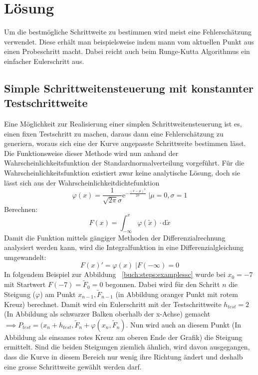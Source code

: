 %
%
%
\section{Lösung
  \label{steps:section:loesung}}
Um die bestmögliche Schrittweite zu bestimmen wird meist eine Fehlerschätzung verwendet.
Diese erhält man beispielsweise indem mann vom aktuellen Punkt aus einen Probeschritt macht.
Dabei reicht auch beim Runge-Kutta Algorithmus ein einfacher Eulerschritt aus.

\subsection{Simple Schrittweitensteuerung mit konstannter Testschrittweite
  \label{steps:subsection:simplestep}}
Eine Möglichkeit zur Realisierung einer simplen Schrittweitensteuerung ist es, einen fixen Testschritt zu machen,
daraus dann eine Fehlerschätzung zu generiern, woraus sich eine der Kurve angepasste Schrittweite bestimmen lässt.
Die Funktionsweise dieser Methode wird nun anhand der Wahrscheinlichkeitsfunktion der Standardnormalverteilung vorgeführt.
Für die Wahrscheinlichkeitsfunktion existiert zwar keine analytische Lösung,
doch sie lässt sich aus der Wahrscheinlichkeitdichtefunktion
\[
  \varphi(x)=\frac{1}{\sqrt{2\pi}\sigma}\mathrm{e}^{-\frac{(x-\mu)^2}{2 \sigma}}\;|\mu=0,\sigma=1
\]
Berechnen:
\[
  F(x)=\int_{-\infty}^{x} \varphi (\tilde{x}) \cdot \mathrm{d} \tilde{x}
\]
Damit die Funktion mittels gängiger Methoden der Differenzialrechnung analysiert werden kann,
wird die Integralfunktion in eine Differenzialgleichung umgewandelt:
\[
  F(x)'=\varphi(x)\;|F(-\infty)=0
\]
In folgendem Beispiel zur Abbildung ~\ref{buch:steps:examplessc} wurde bei $x_0=-7$ mit Startwert $F(-7)=\tilde{F}_0=0$ begonnen.
Dabei wird für den Schritt $n$ die Steigung ($\varphi$) am Punkt $x_{n-1}, \tilde{F}_{n-1}$ (in Abbildung oranger Punkt mit rotem Kreuz) berechnet.
Damit wird ein Eulerschritt mit der Testschrittweite $h_{test}=2$ (In Abbildung als schwarzer Balken oberhalb der x-Achse) gemacht $\implies P_{test}=(x_n+h_{test}, \tilde{F}_n+\varphi(x_n, \tilde{F}_n)$.
Nun wird auch an diesem Punkt (In Abbildung als einsames rotes Kreuz am oberen Ende der Grafik) die Steigung ermittelt.
Sind die beiden Steigungen ziemlich ähnlich, wird davon ausgegangen,
dass die Kurve in diesem Bereich nur wenig ihre Richtung ändert und deshalb eine grosse Schrittweite gewählt werden darf.
